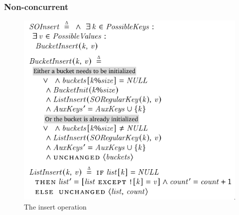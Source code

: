 \documentclass{beamer}
\begin{document}

\begin{frame}
  \frametitle{Non-concurrent}
  \begin{figure}
    \centering
    \includegraphics[height=.7\paperheight]{figures/insert-spec}
    \caption{The insert operation}
    \label{fig:insert}
  \end{figure}
\end{frame}

\end{document}
